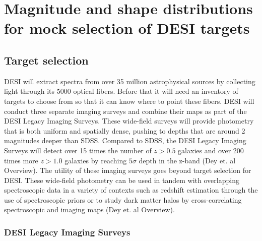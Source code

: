 \chapter{Magnitude and shape distributions for mock selection of DESI targets}

\section{Target selection}


DESI will extract spectra from over 35 million astrophysical sources by collecting light through its 5000 optical fibers. Before that it will need an inventory of targets to choose from so that it can know where to point these fibers. DESI will conduct three separate imaging surveys and combine their maps as part of the DESI Legacy Imaging Surveys. These wide-field surveys will provide photometry that is both uniform and spatially dense, pushing to depths that are around 2 magnitudes deeper than SDSS.  Compared to SDSS, the DESI Legacy Imaging Surveys will detect over 15 times the number of $z>0.5$ galaxies and over 200 times more $z>1.0$ galaxies by reaching $5\sigma$ depth in the z-band (Dey et. al Overview). The utility of these imaging surveys goes beyond target selection for DESI. These wide-field photometry can be used in tandem with overlapping spectroscopic data in a variety of contexts such as redshift estimation through the use of spectroscopic priors or to study dark matter halos by cross-correlating spectroscopic and imaging maps (Dey et. al Overview).

\subsection{DESI Legacy Imaging Surveys}

